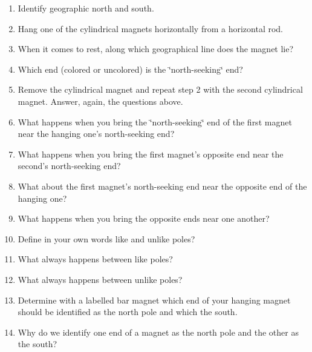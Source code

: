 \begin{enumerate}
\item Identify geographic north and south.
\item Hang one of the cylindrical magnets horizontally from a horizontal rod.
\item When it comes to rest, along which geographical line does the magnet
lie? \vspace{15mm}

\item Which end (colored or uncolored) is the \char`\"{}north-seeking\char`\"{}
end?\vspace{15mm}

\item Remove the cylindrical magnet and repeat step 2 with the second cylindrical magnet. Answer, again, the questions above.\vspace{15mm}

\item What happens when you bring the \char`\"{}north-seeking\char`\"{}
end of the first magnet near the hanging one's north-seeking end?\vspace{15mm}

\item What happens when you bring the first magnet's opposite end near the
second's north-seeking end?\vspace{15mm}

\item What about the first magnet's north-seeking end near the opposite
end of the hanging one?\vspace{15mm}

\item What happens when you bring the opposite ends near one another?\vspace{15mm}

\item Define in your own words like and unlike poles?\vspace{15mm}

\item What always happens between like poles?\vspace{15mm}

\item What always happens between unlike poles?\vspace{15mm}

\item Determine with a labelled bar magnet which end of your hanging magnet
should be identified as the north pole and which the south.
\vspace{10mm}
\item Why do we identify one end of a magnet as the north pole and the other
as the south?\vspace{15mm}


\end{enumerate}
